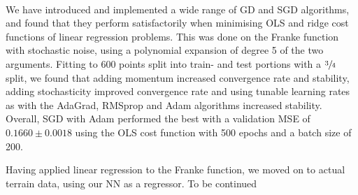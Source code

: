 \\

We have introduced and implemented a wide range of GD and SGD algorithms, and found that they perform satisfactorily when minimising OLS and ridge cost functions of linear regression problems. This was done on the Franke function with stochastic noise, using a polynomial expansion of degree 5 of the two arguments. Fitting to 600 points split into train- and test portions with a $\sfrac{3}{4}$ split, we found that adding momentum increased convergence rate and stability, adding stochasticity improved convergence rate and using tunable learning rates as with the AdaGrad, RMSprop and Adam algorithms increased stability. Overall, SGD with Adam performed the best with a validation MSE of $0.1660 \pm 0.0018$ using the OLS cost function with 500 epochs and a batch size of 200.

Having applied linear regression to the Franke function, we moved on to actual terrain data, using our NN as a regressor. To be continued